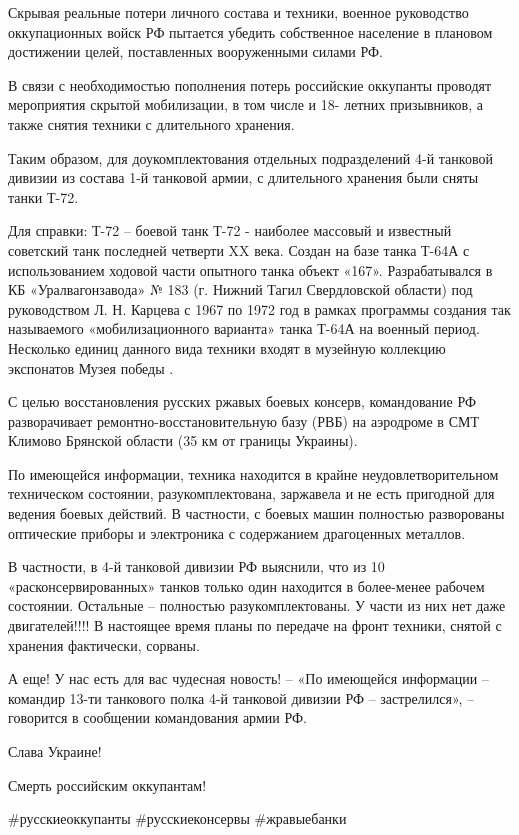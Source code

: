 \begin{itemize}
Скрывая реальные потери личного состава и техники, военное руководство
оккупационных войск РФ пытается убедить собственное население в плановом
достижении целей, поставленных вооруженными силами РФ.

В связи с необходимостью пополнения потерь российские оккупанты проводят
мероприятия скрытой мобилизации, в том числе и 18- летних призывников, а также
снятия техники с длительного хранения.

Таким образом, для доукомплектования отдельных подразделений 4-й танковой
дивизии из состава 1-й танковой армии, с длительного хранения были сняты танки
Т-72.

Для справки: Т-72 – боевой танк Т-72 - наиболее массовый и известный советский
танк последней четверти XX века. Создан на базе танка Т-64А с использованием
ходовой части опытного танка объект «167». Разрабатывался в КБ
«Уралвагонзавода» № 183 (г. Нижний Тагил Свердловской области) под руководством
Л. Н. Карцева с 1967 по 1972 год в рамках программы создания так называемого
«мобилизационного варианта» танка Т-64А на военный период. Несколько единиц
данного вида техники входят в музейную коллекцию экспонатов Музея победы .

С целью восстановления русских ржавых боевых консерв, командование РФ
разворачивает ремонтно-восстановительную базу (РВБ) на аэродроме в СМТ Климово
Брянской области (35 км от границы Украины).

По имеющейся информации, техника находится в крайне неудовлетворительном
техническом состоянии, разукомплектована, заржавела и не есть пригодной для
ведения боевых действий. В частности, с боевых машин полностью разворованы
оптические приборы и электроника с содержанием драгоценных металлов.

В частности, в 4-й танковой дивизии РФ выяснили, что из 10
«расконсервированных» танков только один находится в более-менее рабочем
состоянии. Остальные – полностью разукомплектованы. У части из них нет даже
двигателей!!!! В настоящее время планы по передаче на фронт техники, снятой с
хранения фактически, сорваны.

А еще! У нас есть для вас чудесная новость! – «По имеющейся информации –
командир 13-ти танкового полка 4-й танковой дивизии РФ – застрелился», –
говорится в сообщении командования армии РФ.

Слава Украине!

Смерть российским оккупантам!

\#русскиеоккупанты \#русскиеконсервы \#жравыебанки

\end{itemize} %
